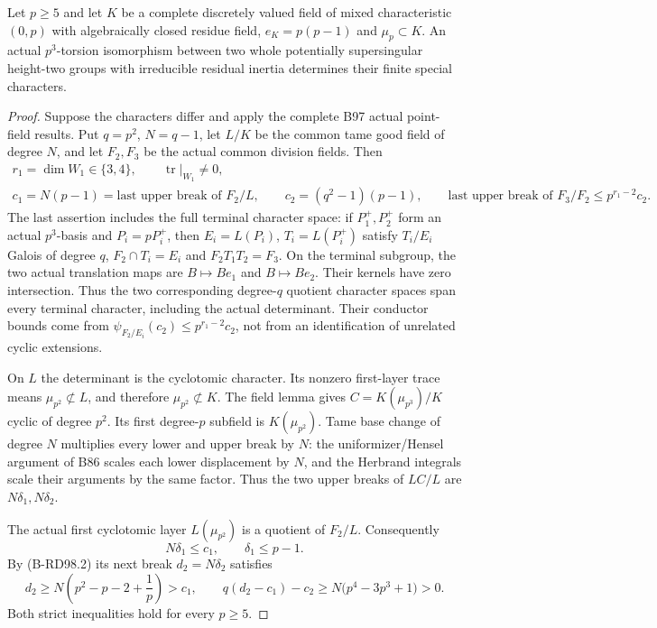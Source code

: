 \begin{theorem}
\label{thm:B-RD98-irreducible}
Let $p\ge5$ and let $K$ be a complete discretely valued field
of mixed characteristic $(0,p)$ with algebraically closed residue
field, $e_K=p(p-1)$ and $\mu_p\subset K$. An actual $p^3$-torsion
isomorphism between two whole potentially supersingular
height-two groups with irreducible residual inertia determines
their finite special characters.
\end{theorem}
\begin{proof}
Suppose the characters differ and apply the complete B97
actual point-field results. Put $q=p^2$, $N=q-1$, let $L/K$
be the common tame good field of degree $N$, and let $F_2,F_3$
be the actual common division fields. Then
\[
\begin{gathered}
 r_1=\dim W_1\in\{3,4\},\qquad
       \operatorname{tr}|_{W_1}\ne0,\\
 c_1=N(p-1)=\text{last upper break of }F_2/L,\qquad
 c_2=(q^2-1)(p-1),\qquad
 \text{last upper break of }F_3/F_2\le p^{r_1-2}c_2.
\end{gathered}                                          \tag{B-RD98.10}
\]
The last assertion includes the full terminal character space:
if $P_1^+,P_2^+$ form an actual $p^3$-basis and
$P_i=pP_i^+$, then $E_i=L(P_i)$, $T_i=L(P_i^+)$ satisfy
$T_i/E_i$ Galois of degree $q$, $F_2\cap T_i=E_i$ and
$F_2T_1T_2=F_3$. On the terminal subgroup, the two actual
translation maps are $B\mapsto Be_1$ and $B\mapsto Be_2$.
Their kernels have zero intersection. Thus the two corresponding
degree-$q$ quotient character spaces span every terminal
character, including the actual determinant. Their conductor
bounds come from $\psi_{F_2/E_i}(c_2)\le p^{r_1-2}c_2$,
not from an identification of unrelated cyclic extensions.

On $L$ the determinant is the cyclotomic character. Its
nonzero first-layer trace means $\mu_{p^2}\not\subset L$,
and therefore $\mu_{p^2}\not\subset K$. The field lemma
gives $C=K(\mu_{p^3})/K$ cyclic of degree $p^2$.
Its first degree-$p$ subfield is $K(\mu_{p^2})$.
Tame base change of degree $N$ multiplies every lower and
upper break by $N$: the uniformizer/Hensel argument of B86
scales each lower displacement by $N$, and the Herbrand
integrals scale their arguments by the same factor.
Thus the two upper breaks of $LC/L$ are $N\delta_1,N\delta_2$.

The actual first cyclotomic layer $L(\mu_{p^2})$ is a quotient
of $F_2/L$. Consequently
\[
                         N\delta_1\le c_1,
                   \qquad \delta_1\le p-1.
                                                        \tag{B-RD98.11}
\]
By (B-RD98.2) its next break $d_2=N\delta_2$ satisfies
\[
 d_2\ge N\left(p^2-p-2+\frac1p\right)>c_1,
 \qquad q(d_2-c_1)-c_2
          \ge N\bigl(p^4-3p^3+1\bigr)>0.
                                                        \tag{B-RD98.12}
\]
Both strict inequalities hold for every $p\ge5$.


\end{proof}
